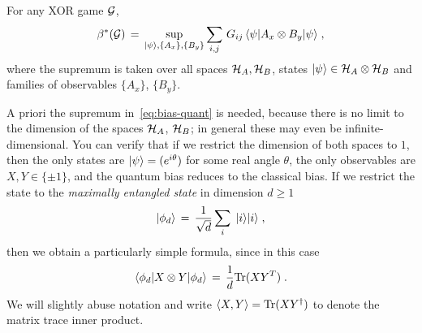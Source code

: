 \begin{lemma}
For any XOR game $\mathcal{G}$, 
 \begin{equation}\label{eq:bias-quant}
 \beta^*(\mathcal{G}) \,=\, \sup_{|\psi\rangle,\{A_x\},\{B_y\}} \sum_{i,j}\, G_{ij}\, \langle\psi| A_x \otimes B_y |\psi\rangle\;,
 \end{equation}
where the supremum is taken over all spaces $\mathcal{H}_A,\mathcal{H}_B$, states $|\psi\rangle\in \mathcal{H}_A\otimes \mathcal{H}_B$ and families of observables $\{A_x\}$, $\{B_y\}$.
\end{lemma}

A priori the supremum in~\eqref{eq:bias-quant} is needed, because there is no limit to the dimension of the spaces $\mathcal{H}_A$, $\mathcal{H}_B$; in general these may even be infinite-dimensional. 
You can verify that if we restrict the dimension of both spaces to $1$, then the only states are $|\psi\rangle = (e^{i\theta})$ for some real angle $\theta$, the only observables are $X,Y\in\{\pm 1\}$, and the quantum bias reduces to the classical bias. If we restrict the state to the \emph{maximally entangled state} in dimension $d\geq 1$
\[|\phi_{d}\rangle \,=\, \frac{1}{\sqrt{d}}\sum_i\; |i\rangle|i\rangle\;,\]
then we obtain a particularly simple formula, since in this case
 \begin{equation}\label{eq:me-trace}
\langle\phi_d| X\otimes Y |\phi_d\rangle \,=\, \frac{1}{d} \mbox{\rm Tr}(XY^T)\;.
\end{equation}
We will slightly abuse notation and write  $\langle X, Y\rangle = \mbox{\rm Tr}(XY^\dagger)$ to denote the matrix trace inner product. 

